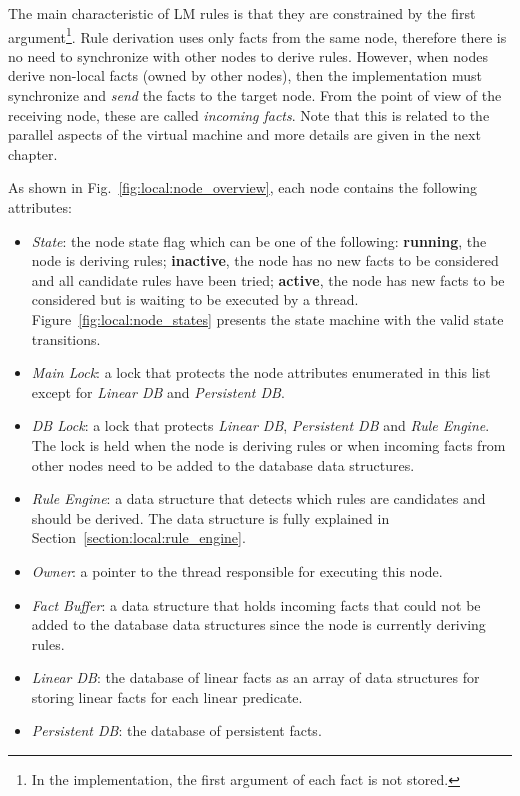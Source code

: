 The main characteristic of LM rules is that they are constrained by the first
argument\footnote{In the implementation, the first argument of each fact is not
stored.}. Rule derivation uses only facts from the same node, therefore there is
no need to synchronize with other nodes to derive rules. However, when nodes
derive non-local facts (owned by other nodes), then the implementation must
synchronize and \emph{send} the facts to the target node. From the point of view
of the receiving node, these are called \emph{incoming facts}. Note that this is related
to the parallel aspects of the virtual machine and more details are given in the
next chapter.

As shown in Fig.~\ref{fig:local:node_overview}, each node contains the
following attributes:

\begin{itemize}
   \item \emph{State}: the node state flag which can be one of the following:
      \textbf{running}, the node is deriving rules; \textbf{inactive}, the node
      has no new facts to be considered and all candidate rules have been tried;
      \textbf{active}, the node has new facts to be considered but is waiting to
      be executed by a thread. Figure~\ref{fig:local:node_states} presents the
      state machine with the valid state transitions.
   \item \emph{Main Lock}: a lock that protects the node attributes enumerated
      in this list except for \emph{Linear DB} and \emph{Persistent DB}.
   \item \emph{DB Lock}: a lock that protects \emph{Linear DB},
      \emph{Persistent DB} and \emph{Rule Engine}. The lock is held when the node is deriving rules or
      when incoming facts from other nodes need to be added to the database data
      structures.
   \item \emph{Rule Engine}: a data structure that detects which rules are
      candidates and should be derived. The data structure is fully explained
      in Section~\ref{section:local:rule_engine}.
   \item \emph{Owner}: a pointer to the thread responsible for executing this
      node.
   \item \emph{Fact Buffer}: a data structure that holds incoming facts that
      could not be added to the database data structures since the node is
      currently deriving rules.
   \item \emph{Linear DB}: the database of linear facts as an array of data
      structures for storing linear facts for each linear predicate.
   \item \emph{Persistent DB}: the database of persistent facts.
\end{itemize}

